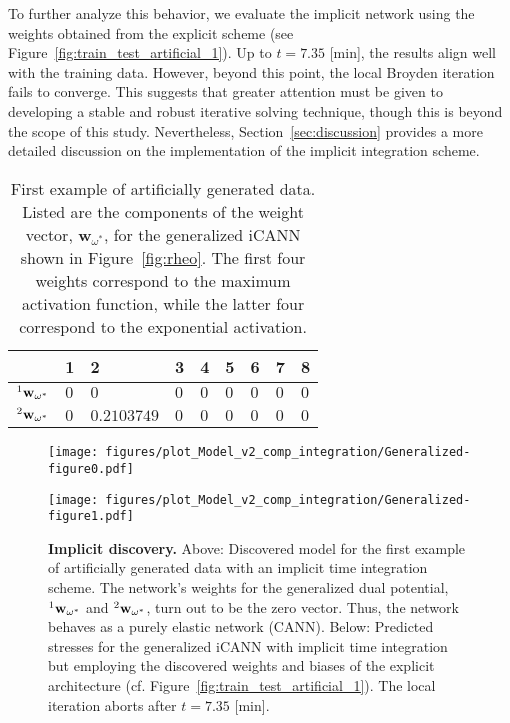 To further analyze this behavior, we evaluate the implicit network using the weights obtained from the explicit scheme (see Figure~\ref{fig:train_test_artificial_1}). 
Up to \(t = 7.35\) [min], the results align well with the training data. 
However, beyond this point, the local Broyden iteration fails to converge. 
This suggests that greater attention must be given to developing a stable and robust iterative solving technique, though this is beyond the scope of this study. 
Nevertheless, Section~\ref{sec:discussion} provides a more detailed discussion on the implementation of the implicit integration scheme.
%
\begin{table}[t]
    \centering
        \begin{tabular}{l | l l l l l l l l}
                &   1   &   2   &   3   &   4   &   5   &   6   &   7   &   8 \\
            \hline
            $\prescript{1}{}{}\mathbf{w}_{\omega^*}$ & $0$ & $0$ & $0$ & $0$ & $0$ & $0$ & $0$ & $0$ \\
            $\prescript{2}{}{}\mathbf{w}_{\omega^*}$ & $0$ & $0.2103749$ & $0$ & $0$ & $0$ & $0$ & $0$ & $0$
        \end{tabular}
    \caption{First example of artificially generated data. Listed are the components of the weight vector, $\mathbf{w}_{\omega^*}$, for the generalized iCANN shown in Figure~\ref{fig:rheo}. The first four weights correspond to the maximum activation function, while the latter four correspond to the exponential activation.}
    \label{tab:w_pot_artificial_1}
\end{table}
%
\begin{figure}[h]
    \centering
    \texttt{[image: figures/plot\_Model\_v2\_comp\_integration/Generalized-figure0.pdf]}

    \texttt{[image: figures/plot\_Model\_v2\_comp\_integration/Generalized-figure1.pdf]}
    \caption{\textbf{Implicit discovery.} Above: Discovered model for the first example of artificially generated data with an implicit time integration scheme. The network's weights for the generalized dual potential, $\prescript{1}{}{}\mathbf{w}_{\omega^*}$ and $\prescript{2}{}{}\mathbf{w}_{\omega^*}$, turn out to be the zero vector. Thus, the network behaves as a purely elastic network (CANN). Below: Predicted stresses for the generalized iCANN with implicit time integration but employing the discovered weights and biases of the explicit architecture (cf. Figure~\ref{fig:train_test_artificial_1}). The local iteration aborts after $t=7.35$ [min].}
    \label{fig:implicit_artificial_1}
\end{figure}
%
%
\FloatBarrier

